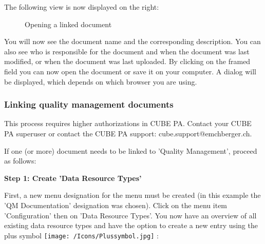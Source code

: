 The following view is now displayed on the right:

\vspace{6cm} 

\begin{figure}[H]
\caption{Opening a linked document}
\end{figure}

You will now see the document name and the corresponding description. You can also see who is responsible for the document and when the document was last modified, or when the document was last uploaded. By clicking on the framed field you can now open the document or save it on your computer. A dialog will be displayed, which depends on which browser you are using.

\subsubsection{Linking quality management documents}
\label{bkm:Ref912000789}

This process requires higher authorizations in CUBE PA. Contact your CUBE PA superuser or contact the CUBE PA support: {\color{red} cube.support@emchberger.ch}.

\vspace{\baselineskip}

If one (or more) document needs to be linked to 'Quality Management', proceed as follows:

\vspace{\baselineskip}

\textbf{Step 1: Create 'Data Resource Types'}

First, a new menu designation for the menu must be created (in this example the 'QM Documentation' designation was chosen). Click on the menu item 'Configuration' then on 'Data Resource Types'. You now have an overview of all existing data resource types and have the option to create a new entry using the plus symbol \texttt{[image: /Icons/Plussymbol.jpg]} :

